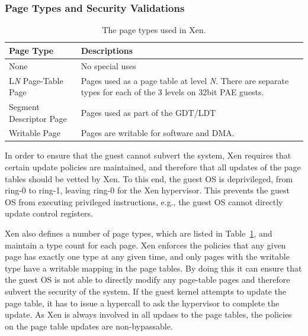 \subsubsection{Page Types and Security Validations}\label{sec:pv-security}
\begin{table}[!ht]
\begin{center}
\begin{tabular}{|p{1.7cm}|p{4.3cm}|}
\hline
{\textbf{Page Type}}  & {\textbf{Descriptions}}     \\ \hline
None & No special uses \\ \hline
L\emph{N} Page-Table Page & Pages used as a page table at level \emph{N}. There are separate types for each of the 3 levels on 32bit PAE guests. \\ \hline
Segment Descriptor Page & Pages used as part of the GDT/LDT \\ \hline
Writable Page & Pages are writable for software and DMA. \\ \hline
\end{tabular}
\end{center}
\caption{The page types used in Xen.}
\label{tab:pagetype}
\end{table}

In order to ensure that the guest cannot subvert the system, Xen requires that certain update policies are maintained, 
and therefore that all updates of the page tables should be vetted by Xen. 
To this end, the guest OS is deprivileged, from ring-0 to ring-1, leaving ring-0 for the Xen hypervisor.
This prevents the guest OS from executing privileged instructions, e.g., the guest OS cannot directly update control registers.

Xen also defines a number of page types, which are listed in Table~\ref{tab:pagetype}, and maintain a type count for each page.
Xen enforces the policies that any given page has exactly one type at any given time, 
and only pages with the writable type have a writable mapping in the page tables. 
By doing this it can ensure that the guest OS is not able to directly modify any page-table pages and therefore subvert the security of the system.
If the guest kernel attempts to update the page table, it has to issue a hypercall to ask the hypervisor to complete the update.
As Xen is always involved in all updaes to the page tables, the policies on the page table updates are non-bypassable.


